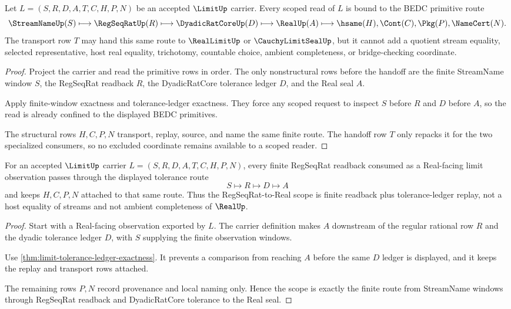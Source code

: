 \begin{theorem}
\label{thm:limit-scoped-kernel-route}
Let $L=(S,R,D,A,T,C,H,P,N)$ be an accepted $\LimitUp$ carrier. Every scoped read of $L$ is bound to the BEDC primitive route
$$
\StreamNameUp(S) \longmapsto \RegSeqRatUp(R) \longmapsto \DyadicRatCoreUp(D) \longmapsto \RealUp(A) \longmapsto \hsame(H),\Cont(C),\Pkg(P),\NameCert(N).
$$
The transport row $T$ may hand this same route to $\RealLimitUp$ or $\CauchyLimitSealUp$, but it cannot add a quotient stream equality, selected representative, host real equality, trichotomy, countable choice, ambient completeness, or bridge-checking coordinate.
\end{theorem}
\begin{proof}
Project the carrier and read the primitive rows in order. The only nonstructural rows before the handoff are the finite StreamName window $S$, the RegSeqRat readback $R$, the DyadicRatCore tolerance ledger $D$, and the Real seal $A$.

Apply finite-window exactness and tolerance-ledger exactness. They force any scoped request to inspect $S$ before $R$ and $D$ before $A$, so the read is already confined to the displayed BEDC primitives.

The structural rows $H,C,P,N$ transport, replay, source, and name the same finite route. The handoff row $T$ only repacks it for the two specialized consumers, so no excluded coordinate remains available to a scoped reader.
\end{proof}

\begin{theorem}
\label{thm:limit-regseqrat-real-scope}
For an accepted $\LimitUp$ carrier $L=(S,R,D,A,T,C,H,P,N)$, every finite RegSeqRat readback consumed as a Real-facing limit observation passes through the displayed tolerance route
$$
S \longmapsto R \longmapsto D \longmapsto A
$$
and keeps $H,C,P,N$ attached to that same route. Thus the RegSeqRat-to-Real scope is finite readback plus tolerance-ledger replay, not a host equality of streams and not ambient completeness of $\RealUp$.
\end{theorem}
\begin{proof}
Start with a Real-facing observation exported by $L$. The carrier definition makes $A$ downstream of the regular rational row $R$ and the dyadic tolerance ledger $D$, with $S$ supplying the finite observation windows.

Use \autoref{thm:limit-tolerance-ledger-exactness}. It prevents a comparison from reaching $A$ before the same $D$ ledger is displayed, and it keeps the replay and transport rows attached.

The remaining rows $P,N$ record provenance and local naming only. Hence the scope is exactly the finite route from StreamName windows through RegSeqRat readback and DyadicRatCore tolerance to the Real seal.
\end{proof}

